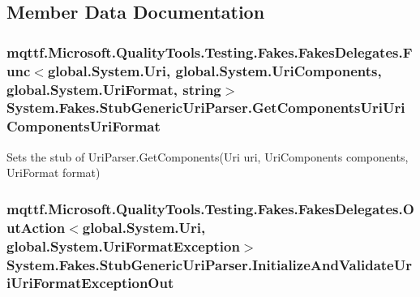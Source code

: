 \subsection{Member Data Documentation}
\hypertarget{class_system_1_1_fakes_1_1_stub_generic_uri_parser_aa81574cffb05011a2c9792d4fd758688}{
\subsubsection[{Get\-Components\-Uri\-Uri\-Components\-Uri\-Format}]{\setlength{\rightskip}{0pt plus 5cm}mqttf.\-Microsoft.\-Quality\-Tools.\-Testing.\-Fakes.\-Fakes\-Delegates.\-Func$<$global.\-System.\-Uri, global.\-System.\-Uri\-Components, global.\-System.\-Uri\-Format, string$>$ System.\-Fakes.\-Stub\-Generic\-Uri\-Parser.\-Get\-Components\-Uri\-Uri\-Components\-Uri\-Format}}\label{class_system_1_1_fakes_1_1_stub_generic_uri_parser_aa81574cffb05011a2c9792d4fd758688}


Sets the stub of Uri\-Parser.\-Get\-Components(\-Uri uri, Uri\-Components components, Uri\-Format format)

\hypertarget{class_system_1_1_fakes_1_1_stub_generic_uri_parser_a573e8603d7b226dafea0252230070da8}{
\subsubsection[{Initialize\-And\-Validate\-Uri\-Uri\-Format\-Exception\-Out}]{\setlength{\rightskip}{0pt plus 5cm}mqttf.\-Microsoft.\-Quality\-Tools.\-Testing.\-Fakes.\-Fakes\-Delegates.\-Out\-Action$<$global.\-System.\-Uri, global.\-System.\-Uri\-Format\-Exception$>$ System.\-Fakes.\-Stub\-Generic\-Uri\-Parser.\-Initialize\-And\-Validate\-Uri\-Uri\-Format\-Exception\-Out}}\label{class_system_1_1_fakes_1_1_stub_generic_uri_parser_a573e8603d7b226dafea0252230070da8}


